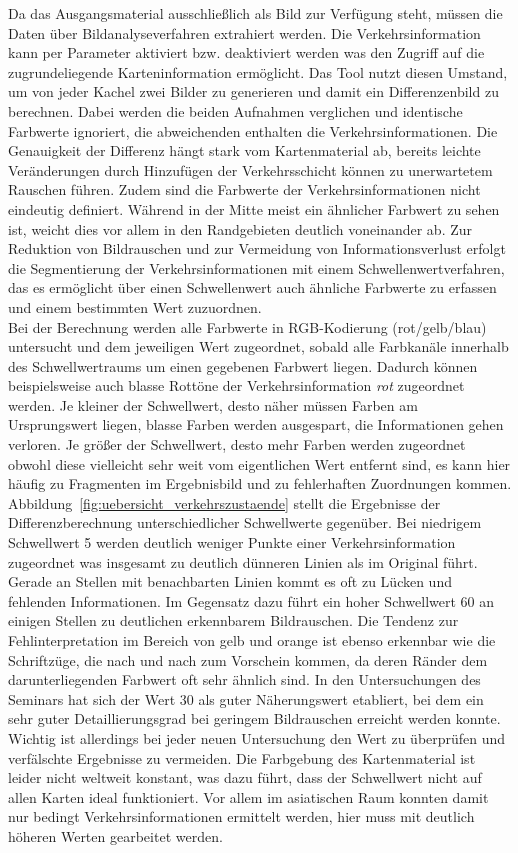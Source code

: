 Da das Ausgangsmaterial ausschließlich als Bild zur Verfügung steht, müssen die Daten über Bildanalyseverfahren extrahiert werden. Die Verkehrsinformation kann per Parameter aktiviert bzw. deaktiviert werden was den Zugriff auf die zugrundeliegende Karteninformation ermöglicht. Das Tool nutzt diesen Umstand, um von jeder Kachel zwei Bilder zu generieren und damit ein Differenzenbild zu berechnen. Dabei werden die beiden Aufnahmen verglichen und identische Farbwerte ignoriert, die abweichenden enthalten die Verkehrsinformationen. Die Genauigkeit der Differenz hängt stark vom Kartenmaterial ab, bereits leichte Veränderungen durch Hinzufügen der Verkehrsschicht können zu unerwartetem Rauschen führen. Zudem sind die Farbwerte der Verkehrsinformationen nicht eindeutig definiert. Während in der Mitte meist ein ähnlicher Farbwert zu sehen ist, weicht dies vor allem in den Randgebieten deutlich voneinander ab. Zur Reduktion von Bildrauschen und zur Vermeidung von Informationsverlust erfolgt die Segmentierung der Verkehrsinformationen mit einem Schwellenwertverfahren, das es ermöglicht über einen Schwellenwert auch ähnliche Farbwerte zu erfassen und einem bestimmten Wert zuzuordnen.\\

Bei der Berechnung werden alle Farbwerte in RGB-Kodierung (rot/gelb/blau) untersucht und dem jeweiligen Wert zugeordnet, sobald alle Farbkanäle innerhalb des Schwellwertraums um einen gegebenen Farbwert liegen. Dadurch können beispielsweise auch blasse Rottöne der Verkehrsinformation \textit{rot} zugeordnet werden. Je kleiner der Schwellwert, desto näher müssen Farben am Ursprungswert liegen, blasse Farben werden ausgespart, die Informationen gehen verloren. Je größer der Schwellwert, desto mehr Farben werden zugeordnet obwohl diese vielleicht sehr weit vom eigentlichen Wert entfernt sind, es kann hier häufig zu Fragmenten im Ergebnisbild und zu fehlerhaften Zuordnungen kommen. Abbildung~\ref{fig:uebersicht_verkehrszustaende} stellt die Ergebnisse der Differenzberechnung unterschiedlicher Schwellwerte gegenüber. Bei niedrigem Schwellwert 5 werden deutlich weniger Punkte einer Verkehrsinformation zugeordnet was insgesamt zu deutlich dünneren Linien als im Original führt. Gerade an Stellen mit benachbarten Linien kommt es oft zu Lücken und fehlenden Informationen. Im Gegensatz dazu führt ein hoher Schwellwert 60 an einigen Stellen zu deutlichen erkennbarem Bildrauschen. Die Tendenz zur Fehlinterpretation im Bereich von gelb und orange ist ebenso erkennbar wie die Schriftzüge, die nach und nach zum Vorschein kommen, da deren Ränder dem darunterliegenden Farbwert oft sehr ähnlich sind. In den Untersuchungen des Seminars hat sich der Wert 30 als guter Näherungswert etabliert, bei dem ein sehr guter Detaillierungsgrad bei geringem Bildrauschen erreicht werden konnte. Wichtig ist allerdings bei jeder neuen Untersuchung den Wert zu überprüfen und verfälschte Ergebnisse zu vermeiden. Die Farbgebung des Kartenmaterial ist leider nicht weltweit konstant, was dazu führt, dass der Schwellwert nicht auf allen Karten ideal funktioniert. Vor allem im asiatischen Raum konnten damit nur bedingt Verkehrsinformationen ermittelt werden, hier muss mit deutlich höheren Werten gearbeitet werden.\\

